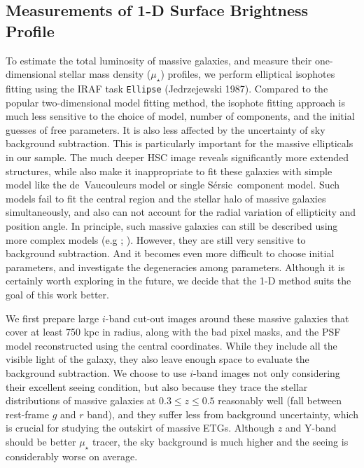 \documentclass{emulateapj}
\def\ser{{S\'{e}rsic\ }}
\def\mden{{$\mu_{\star}$}}
\begin{document}
\begin{CJK*}{UTF8}{gbsn}
\section{Measurements of 1-D Surface Brightness Profile}
    \label{sec:ellipse}
    
    To estimate the total luminosity of massive galaxies, and measure their 
    one-dimensional stellar mass density (\mden{}) profiles, we perform elliptical 
    isophotes fitting using the IRAF task \texttt{Ellipse} (Jedrzejewski 1987).  
    Compared to the popular two-dimensional model fitting method, the isophote fitting
    approach is much less sensitive to the choice of model, number of components, 
    and the initial guesses of free parameters. 
    It is also less affected by the uncertainty of sky background subtraction.  
    This is particularly important for the massive ellipticals in our sample.  
    The much deeper HSC image reveals significantly more extended structures, 
    while also make it inappropriate to fit these galaxies with simple model like 
    the de~Vaucouleurs model or single \ser component model. 
    Such models fail to fit the central region and the stellar halo of massive 
    galaxies simultaneously, and also can not account for the radial variation of 
    ellipticity and position angle. 
    In principle, such massive galaxies can still be described using more complex 
    models (e.g \citealt{Huang2013a}; \citealt{Huang2013b}).  
    However, they are still very sensitive to background subtraction. 
    And it becomes even more difficult to choose initial parameters, and investigate
    the degeneracies among parameters. 
    Although it is certainly worth exploring in the future, we decide that the 1-D 
    method suits the goal of this work better.
        
    We first prepare large $i$-band cut-out images around these massive galaxies 
    that cover at least 750 kpc in radius, along with the bad pixel masks, and the 
    PSF model reconstructed using the central coordinates. 
    While they include all the visible light of the galaxy, they also leave enough 
    space to evaluate the background subtraction. 
    We choose to use $i$-band images not only considering their excellent seeing
    condition, but also because they trace the stellar distributions of massive 
    galaxies at $0.3 \leq z \leq 0.5$ reasonably well (fall between rest-frame $g$ 
    and $r$ band), and they suffer less from background uncertainty, which is crucial 
    for studying the outskirt of massive ETGs.  
    Although $z$ and Y-band should be better \mden{} tracer, the sky background 
    is much higher and the seeing is considerably worse on average. 
    

\end{CJK*}
\end{document}
